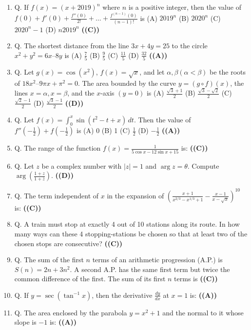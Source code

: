 \documentclass{article}
\begin{document}
\begin{enumerate}
(A) $8 f'(1)$
(B) $4 f'(1)$
(C) $2 f'(1)$
(D) $f'(1)$ \hfill \textbf{((A))}
\item Q. If $f(x) = (x + 2019)^n$ where $n$ is a positive integer, then the value of $f(0) + f'(0) + \frac{f''(0)}{2!} + \dots + \frac{f^{(n-1)}(0)}{(n-1)!}$ is
(A) $2019^n$
(B) $2020^n$
(C) $2020^n - 1$
(D) $n 2019^n$ \hfill \textbf{((C))}
\item Q. The shortest distance from the line $3x + 4y = 25$ to the circle $x^2 + y^2 = 6x – 8y$ is
(A) $\frac{7}{5}$
(B) $\frac{9}{5}$
(C) $\frac{11}{5}$
(D) $\frac{32}{5}$ \hfill \textbf{((A))}
\item Q. Let $g(x) = \cos(x^2)$, $f(x) = \sqrt{x}$, and let $\alpha, \beta (\alpha < \beta)$ be the roots of $18x^2 – 9\pi x + \pi^2 = 0$. The area bounded by the curve $y = (g \circ f)(x)$, the lines $x = \alpha, x = \beta$, and the $x$-axis $(y = 0)$ is
(A) $\frac{\sqrt{3}+1}{2}$
(B) $\frac{\sqrt{3}-\sqrt{2}}{2}$
(C) $\frac{\sqrt{2}-1}{2}$
(D) $\frac{\sqrt{3}-1}{2}$ \hfill \textbf{((D))}
\item Q. Let $f(x) = \int_0^x \sin(t^2 - t + x)\,dt$. Then the value of $f''(-\frac{1}{2}) + f(-\frac{1}{2})$ is
(A) 0
(B) 1
(C) $\frac{1}{2}$
(D) $-\frac{1}{2}$ \hfill \textbf{((A))}
\item Q. The range of the function $f(x) = \frac{1}{5 \cos x - 12 \sin x + 15}$ is: \hfill \textbf{((C))}
\item Q. Let $z$ be a complex number with $|z| = 1$ and $\arg z = \theta$. Compute $\arg \left(\frac{1+z}{1+\bar{z}}\right)$. \hfill \textbf{((D))}
\item Q. The term independent of $x$ in the expansion of $\left(\frac{x+1}{x^{2/3} - x^{1/3}+1} - \frac{x-1}{x - \sqrt{x}}\right)^{10}$ is: \hfill \textbf{((C))}
\item Q. A train must stop at exactly 4 out of 10 stations along its route. In how many ways can these 4 stopping-stations be chosen so that at least two of the chosen stops are consecutive? \hfill \textbf{((C))}
\item Q. The sum of the first $n$ terms of an arithmetic progression (A.P.) is $S(n) = 2n + 3n^2$. A second A.P. has the same first term but twice the common difference of the first. The sum of its first $n$ terms is \hfill \textbf{((C))}
\item Q. If $y = \sec(\tan^{-1}x)$, then the derivative $\frac{dy}{dx}$ at $x = 1$ is: \hfill \textbf{((A))}
\item Q. The area enclosed by the parabola $y = x^2 + 1$ and the normal to it whose slope is $-1$ is: \hfill \textbf{((A))}

\end{enumerate}
\end{document}

